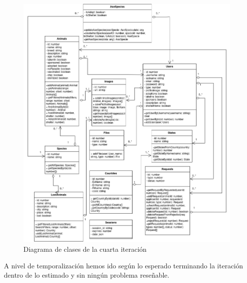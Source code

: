 \begin{figure}[H]
	\centering

	\hspace*{-3.5cm} 
	\includegraphics[width=1.5\linewidth]{"sprint 4/clases"}
	\caption{Diagrama de clases de la cuarta iteración}
	\label{fig:clasesCuarta}
\end{figure}

\pagebreak 
A nivel de temporalización hemos ido según lo esperado terminando la iteración dentro de lo estimado y sin ningún problema reseñable.















